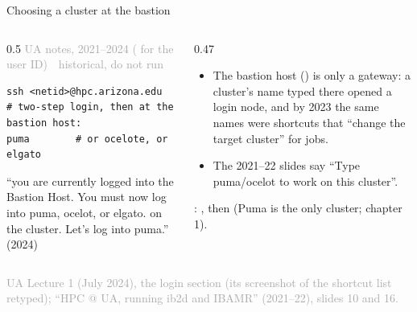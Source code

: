 \documentclass[aspectratio=169,11pt]{beamer}
\newcommand{\sourcecredit}[1]{\vfill\begin{flushright}\tiny\textcolor{DarkGray}{#1}\end{flushright}}
\newcommand{\hist}[1]{{\tiny\sffamily\textcolor{DarkGray}{#1\ \textbullet\ historical, do not run}}\par\nointerlineskip\vspace{0.3mm}}
\begin{document}
\begin{frame}[fragile]{Choosing a cluster at the bastion}
\label{fr:bastion}
\begin{columns}[T,onlytextwidth]
\begin{column}{0.5\textwidth}
\hist{UA notes, 2021--2024 ( for the user ID)}
\begin{lstlisting}[style=hist]
ssh <netid>@hpc.arizona.edu
# two-step login, then at the bastion host:
puma        # or ocelote, or elgato
\end{lstlisting}
\footnotesize ``you are currently logged into the Bastion Host. You must now log into puma, ocelot, or elgato. on the cluster. Let's log into puma.'' (2024)
\end{column}
\begin{column}{0.47\textwidth}
\footnotesize
\begin{itemize}\setlength{\itemsep}{2pt}
  \item The bastion host () is only a gateway: a cluster's name typed there opened a login node, and by 2023 the same names were shortcuts that ``change the target cluster'' for jobs.
  \item The 2021--22 slides say ``Type puma/ocelot to work on this cluster''.
\end{itemize}
\vspace{1mm}
: , then  (Puma is the only cluster; chapter 1).
\end{column}
\end{columns}
\sourcecredit{UA Lecture 1 (July 2024), the login section (its screenshot of the shortcut list retyped); ``HPC @ UA, running ib2d and IBAMR'' (2021--22), slides 10 and 16.}
\end{frame}
\end{document}

